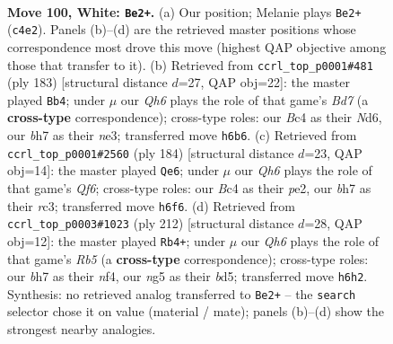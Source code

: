 \documentclass[11pt]{article}
\begin{document}
\clearpage

\begin{figure}[p]\centering
\begin{subfigure}{0.46\textwidth}\centering
\resizebox{\linewidth}{!}{%
\newchessgame
\chessboard[
  setfen={8/2N4b/7Q/6n1/1pB3k1/4K3/8/8 w - - 0 100},
  showmover=false,
  pgfstyle=straightmove, color=movearrow, markmove={c4-e2}
]}
\caption{}
\end{subfigure}\hfill
\begin{subfigure}{0.46\textwidth}\centering
\resizebox{\linewidth}{!}{%
\newchessgame
\chessboard[
  setfen={8/8/3n4/8/3k4/4N3/2Kb1P2/8 b - - 13 92},
  showmover=false,
  pgfstyle=straightmove, color=movearrow, markmove={d2-b4}
]}
\caption{}
\end{subfigure}
\\[4pt]
\begin{subfigure}{0.46\textwidth}\centering
\resizebox{\linewidth}{!}{%
\newchessgame
\chessboard[
  setfen={8/8/5Q2/8/8/2r5/4p1k1/1K1n4 w - - 4 93},
  showmover=false,
  pgfstyle=straightmove, color=movearrow, markmove={f6-e6}
]}
\caption{}
\end{subfigure}\hfill
\begin{subfigure}{0.46\textwidth}\centering
\resizebox{\linewidth}{!}{%
\newchessgame
\chessboard[
  setfen={8/8/8/1R1b4/4kn1p/8/5K2/8 w - - 64 107},
  showmover=false,
  pgfstyle=straightmove, color=movearrow, markmove={b5-b4}
]}
\caption{}
\end{subfigure}
\caption{\textbf{Move 100, White: \texttt{Be2+}.} (a) Our position; Melanie plays \texttt{Be2+} (\texttt{c4e2}). Panels (b)--(d) are the retrieved master positions whose correspondence most drove this move (highest QAP objective among those that transfer to it). (b) Retrieved from \texttt{ccrl\_top\_p0001\#481} (ply 183) [structural distance $d$=27, QAP obj=22]: the master played \texttt{Bb4}; under $\mu$ our \emph{Qh6} plays the role of that game's \emph{Bd7} (a \textbf{cross-type} correspondence); cross-type roles: our \emph{B}c4 as their \emph{N}d6, our \emph{b}h7 as their \emph{n}e3; transferred move \texttt{h6b6}. (c) Retrieved from \texttt{ccrl\_top\_p0001\#2560} (ply 184) [structural distance $d$=23, QAP obj=14]: the master played \texttt{Qe6}; under $\mu$ our \emph{Qh6} plays the role of that game's \emph{Qf6}; cross-type roles: our \emph{B}c4 as their \emph{p}e2, our \emph{b}h7 as their \emph{r}c3; transferred move \texttt{h6f6}. (d) Retrieved from \texttt{ccrl\_top\_p0003\#1023} (ply 212) [structural distance $d$=28, QAP obj=12]: the master played \texttt{Rb4+}; under $\mu$ our \emph{Qh6} plays the role of that game's \emph{Rb5} (a \textbf{cross-type} correspondence); cross-type roles: our \emph{b}h7 as their \emph{n}f4, our \emph{n}g5 as their \emph{b}d5; transferred move \texttt{h6h2}. Synthesis: no retrieved analog transferred to \texttt{Be2+} -- the \texttt{search} selector chose it on value (material / mate); panels (b)--(d) show the strongest nearby analogies.}
\label{fig:thought-m198}
\end{figure}
\end{document}

